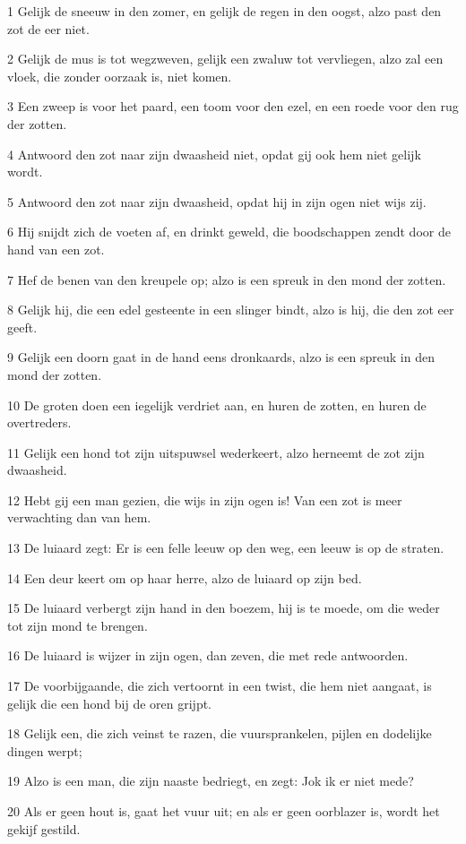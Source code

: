 \par 1 Gelijk de sneeuw in den zomer, en gelijk de regen in den oogst, alzo past den zot de eer niet.
\par 2 Gelijk de mus is tot wegzweven, gelijk een zwaluw tot vervliegen, alzo zal een vloek, die zonder oorzaak is, niet komen.
\par 3 Een zweep is voor het paard, een toom voor den ezel, en een roede voor den rug der zotten.
\par 4 Antwoord den zot naar zijn dwaasheid niet, opdat gij ook hem niet gelijk wordt.
\par 5 Antwoord den zot naar zijn dwaasheid, opdat hij in zijn ogen niet wijs zij.
\par 6 Hij snijdt zich de voeten af, en drinkt geweld, die boodschappen zendt door de hand van een zot.
\par 7 Hef de benen van den kreupele op; alzo is een spreuk in den mond der zotten.
\par 8 Gelijk hij, die een edel gesteente in een slinger bindt, alzo is hij, die den zot eer geeft.
\par 9 Gelijk een doorn gaat in de hand eens dronkaards, alzo is een spreuk in den mond der zotten.
\par 10 De groten doen een iegelijk verdriet aan, en huren de zotten, en huren de overtreders.
\par 11 Gelijk een hond tot zijn uitspuwsel wederkeert, alzo herneemt de zot zijn dwaasheid.
\par 12 Hebt gij een man gezien, die wijs in zijn ogen is! Van een zot is meer verwachting dan van hem.
\par 13 De luiaard zegt: Er is een felle leeuw op den weg, een leeuw is op de straten.
\par 14 Een deur keert om op haar herre, alzo de luiaard op zijn bed.
\par 15 De luiaard verbergt zijn hand in den boezem, hij is te moede, om die weder tot zijn mond te brengen.
\par 16 De luiaard is wijzer in zijn ogen, dan zeven, die met rede antwoorden.
\par 17 De voorbijgaande, die zich vertoornt in een twist, die hem niet aangaat, is gelijk die een hond bij de oren grijpt.
\par 18 Gelijk een, die zich veinst te razen, die vuursprankelen, pijlen en dodelijke dingen werpt;
\par 19 Alzo is een man, die zijn naaste bedriegt, en zegt: Jok ik er niet mede?
\par 20 Als er geen hout is, gaat het vuur uit; en als er geen oorblazer is, wordt het gekijf gestild.
